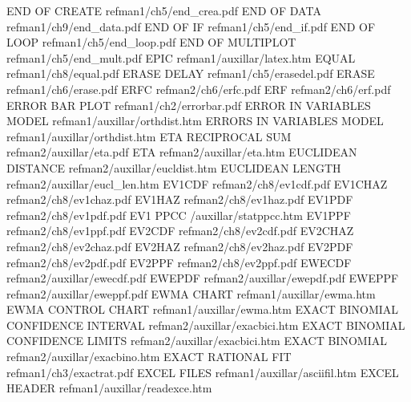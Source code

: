 END OF CREATE                           refman1/ch5/end_crea.pdf
END OF DATA                             refman1/ch9/end_data.pdf
END OF IF                               refman1/ch5/end_if.pdf
END OF LOOP                             refman1/ch5/end_loop.pdf
END OF MULTIPLOT                        refman1/ch5/end_mult.pdf
EPIC                                    refman1/auxillar/latex.htm
EQUAL                                   refman1/ch8/equal.pdf
ERASE DELAY                             refman1/ch5/erasedel.pdf
ERASE                                   refman1/ch6/erase.pdf
ERFC                                    refman2/ch6/erfc.pdf
ERF                                     refman2/ch6/erf.pdf
ERROR BAR PLOT                          refman1/ch2/errorbar.pdf
ERROR IN VARIABLES MODEL                refman1/auxillar/orthdist.htm
ERRORS IN VARIABLES MODEL               refman1/auxillar/orthdist.htm
ETA RECIPROCAL SUM                      refman2/auxillar/eta.pdf
ETA                                     refman2/auxillar/eta.htm
EUCLIDEAN DISTANCE                      refman2/auxillar/eucldist.htm
EUCLIDEAN LENGTH                        refman2/auxillar/eucl_len.htm
EV1CDF                                  refman2/ch8/ev1cdf.pdf
EV1CHAZ                                 refman2/ch8/ev1chaz.pdf
EV1HAZ                                  refman2/ch8/ev1haz.pdf
EV1PDF                                  refman2/ch8/ev1pdf.pdf
EV1 PPCC                                /auxillar/statppcc.htm
EV1PPF                                  refman2/ch8/ev1ppf.pdf
EV2CDF                                  refman2/ch8/ev2cdf.pdf
EV2CHAZ                                 refman2/ch8/ev2chaz.pdf
EV2HAZ                                  refman2/ch8/ev2haz.pdf
EV2PDF                                  refman2/ch8/ev2pdf.pdf
EV2PPF                                  refman2/ch8/ev2ppf.pdf
EWECDF                                  refman2/auxillar/ewecdf.pdf
EWEPDF                                  refman2/auxillar/ewepdf.pdf
EWEPPF                                  refman2/auxillar/eweppf.pdf
EWMA CHART                              refman1/auxillar/ewma.htm
EWMA CONTROL CHART                      refman1/auxillar/ewma.htm
EXACT BINOMIAL CONFIDENCE INTERVAL      refman2/auxillar/exacbici.htm
EXACT BINOMIAL CONFIDENCE LIMITS        refman2/auxillar/exacbici.htm
EXACT BINOMIAL                          refman2/auxillar/exacbino.htm
EXACT RATIONAL FIT                      refman1/ch3/exactrat.pdf
EXCEL FILES                             refman1/auxillar/asciifil.htm
EXCEL HEADER                            refman1/auxillar/readexce.htm

